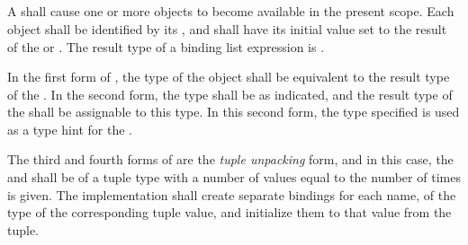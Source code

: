\begin{grammar}
 \\
	   \\
	   \\

 \\
	 \optional{\terminal{,}} \\
	 \terminal{,}  \\

 \\
	 \terminal{=}  \\
	 \terminal{:}  \terminal{=}  \\
	 \terminal{=}  \\
	 \terminal{:}  \terminal{=}  \\

 \\
	 \terminal{,}  \\
	 \terminal{,}  \\
\end{grammar}

\specsubsubitem
A  shall cause one or more objects to become
available in the present scope. Each object shall be identified by its
, and shall have its initial value set to the result of the
 or . The result
type of a binding list expression is .

\specsubsubitem
In the first form of , the type of the object shall
be equivalent to the result type of the . In the
second form, the type shall be as indicated, and the result type of the
 shall be assignable to this type. In this second form,
the type specified is used as a type hint for the .

\specsubsubitem
The third and fourth forms of  are the \textit{tuple
unpacking} form, and in this case, the  and
 shall be of a tuple type with a number of values equal
to the number of times  is given. The implementation shall
create separate bindings for each name, of the type of the corresponding tuple
value, and initialize them to that value from the tuple.

